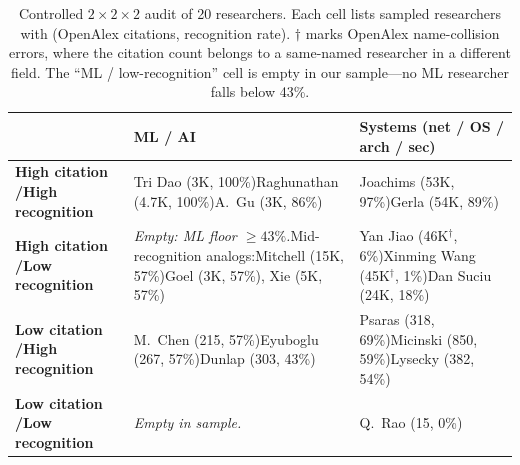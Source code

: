\documentclass[11pt]{article}
\begin{document}
\begin{table}[H]
\centering
\small
\caption{Controlled $2\times2\times2$ audit of 20 researchers. Each cell lists sampled researchers with (OpenAlex citations, recognition rate). $\dagger$ marks OpenAlex name-collision errors, where the citation count belongs to a same-named researcher in a different field. The ``ML / low-recognition'' cell is empty in our sample---no ML researcher falls below 43\%.}
\label{tab:8cell}
\renewcommand{\arraystretch}{1.15}
\begin{tabular}{p{3.2cm}|p{5.1cm}|p{5.1cm}}
\toprule
 & \textbf{ML / AI} & \textbf{Systems (net / OS / arch / sec)} \\
\midrule
\textbf{High citation /\newline High recognition} & Tri Dao (3K, 100\%)\newline Raghunathan (4.7K, 100\%)\newline A.\ Gu (3K, 86\%) & Joachims (53K, 97\%)\newline Gerla (54K, 89\%) \\
\midrule
\textbf{High citation /\newline Low recognition}  & \emph{Empty: ML floor $\geq 43\%$.}\newline Mid-recognition analogs:\newline Mitchell (15K, 57\%)\newline Goel (3K, 57\%), Xie (5K, 57\%) & Yan Jiao (46K$^\dagger$, 6\%)\newline Xinming Wang (45K$^\dagger$, 1\%)\newline Dan Suciu (24K, 18\%) \\
\midrule
\textbf{Low citation /\newline High recognition}  & M.\ Chen (215, 57\%)\newline Eyuboglu (267, 57\%)\newline Dunlap (303, 43\%) & Psaras (318, 69\%)\newline Micinski (850, 59\%)\newline Lysecky (382, 54\%) \\
\midrule
\textbf{Low citation /\newline Low recognition}   & \emph{Empty in sample.} & Q.\ Rao (15, 0\%) \\
\bottomrule
\end{tabular}
\end{table}
\end{document}
